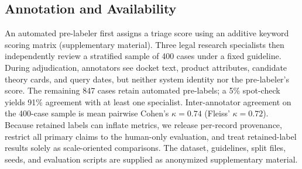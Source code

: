 \subsection{Annotation and Availability}
\label{sec:annotation}

An automated pre-labeler first assigns a triage score using an additive keyword scoring matrix (supplementary material).
Three legal research specialists then independently review a stratified sample of 400 cases under a fixed guideline.
During adjudication, annotators see docket text, product attributes, candidate theory cards, and query dates, but neither system identity nor the pre-labeler's score.
The remaining 847 cases retain automated pre-labels; a 5\% spot-check yields 91\% agreement with at least one specialist.
Inter-annotator agreement on the 400-case sample is mean pairwise Cohen's $\kappa = 0.74$ (Fleiss' $\kappa = 0.72$).
Because retained labels can inflate metrics, we release per-record provenance, restrict all primary claims to the human-only evaluation, and treat retained-label results solely as scale-oriented comparisons.
The dataset, guidelines, split files, seeds, and evaluation scripts are supplied as anonymized supplementary material.
